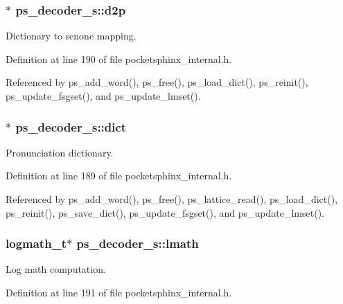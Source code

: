 \subsubsection[{d2p}]{$\ast$ ps\-\_\-decoder\-\_\-s\-::d2p}\label{structps__decoder__s_ae6515cbc261686f3f3bbd95719f79793}


Dictionary to senone mapping. 



Definition at line 190 of file pocketsphinx\-\_\-internal.\-h.



Referenced by ps\-\_\-add\-\_\-word(), ps\-\_\-free(), ps\-\_\-load\-\_\-dict(), ps\-\_\-reinit(), ps\-\_\-update\-\_\-fsgset(), and ps\-\_\-update\-\_\-lmset().

\subsubsection[{dict}]{$\ast$ ps\-\_\-decoder\-\_\-s\-::dict}\label{structps__decoder__s_aef6228c17907cc1d0cef835b238b5d91}


Pronunciation dictionary. 



Definition at line 189 of file pocketsphinx\-\_\-internal.\-h.



Referenced by ps\-\_\-add\-\_\-word(), ps\-\_\-free(), ps\-\_\-lattice\-\_\-read(), ps\-\_\-load\-\_\-dict(), ps\-\_\-reinit(), ps\-\_\-save\-\_\-dict(), ps\-\_\-update\-\_\-fsgset(), and ps\-\_\-update\-\_\-lmset().

\subsubsection[{lmath}]{\setlength{\rightskip}{0pt plus 5cm}logmath\-\_\-t$\ast$ ps\-\_\-decoder\-\_\-s\-::lmath}\label{structps__decoder__s_abd17fe329f2fb219c5a534f3217c5b95}


Log math computation. 



Definition at line 191 of file pocketsphinx\-\_\-internal.\-h.



